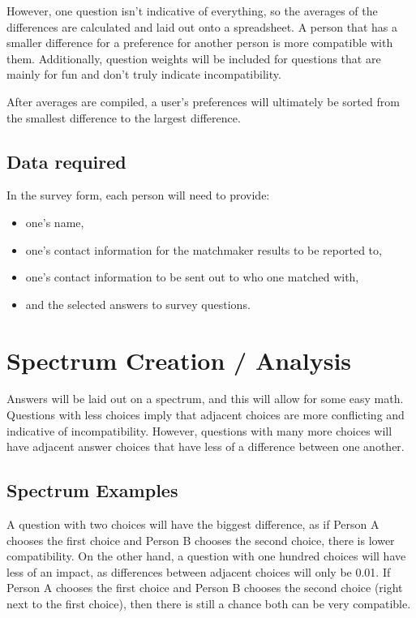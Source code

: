 \documentclass[12pt]{article}
\begin{document}
However, one question isn't indicative of everything, so the averages of the
differences are calculated and laid out onto a spreadsheet. A person that has a
smaller difference for a preference for another person is more compatible with
them. Additionally, question weights will be included for questions that are
mainly for fun and don't truly indicate incompatibility.

After averages are compiled, a user's preferences will ultimately be sorted from
the smallest difference to the largest difference.

\subsection{Data required}
In the survey form, each person will need to provide:
\begin{itemize}
    \item one's name,
    \item one's contact information for the matchmaker results to be reported to,
    \item one's contact information to be sent out to who one matched with,
    \item and the selected answers to survey questions.
\end{itemize}

\section{Spectrum Creation / Analysis}
Answers will be laid out on a spectrum, and this will allow for some easy math.
Questions with less choices imply that adjacent choices are more conflicting and
indicative of incompatibility. However, questions with many more choices will
have adjacent answer choices that have less of a difference between one
another.

\subsection{Spectrum Examples}
A question with two choices will have the biggest difference, as if Person A chooses the
first choice and Person B chooses the second choice, there is lower compatibility.
On the other hand, a question with one hundred choices will have less of an
impact, as differences between adjacent choices will only be 0.01. If Person A
chooses the first choice and Person B chooses the second choice (right next to
the first choice), then there is still a chance both can be very compatible.
\end{document}
